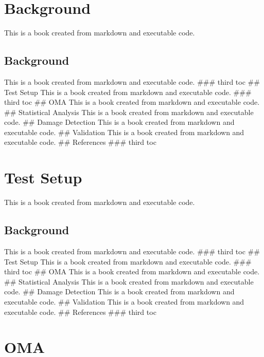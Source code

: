 \documentclass[
  letterpaper,
  DIV=11,
  numbers=noendperiod]{scrreprt}
\begin{document}
\hypertarget{background-15}{%
\chapter{Background}\label{background-15}}

This is a book created from markdown and executable code.

\hypertarget{background-16}{%
\section{Background}\label{background-16}}

This is a book created from markdown and executable code. \#\#\# third
toc \#\# Test Setup This is a book created from markdown and executable
code. \#\#\# third toc \#\# OMA This is a book created from markdown and
executable code. \#\# Statistical Analysis This is a book created from
markdown and executable code. \#\# Damage Detection This is a book
created from markdown and executable code. \#\# Validation This is a
book created from markdown and executable code. \#\# References \#\#\#
third toc

\hypertarget{test-setup-1}{%
\chapter{Test Setup}\label{test-setup-1}}

This is a book created from markdown and executable code.

\hypertarget{background-17}{%
\section{Background}\label{background-17}}

This is a book created from markdown and executable code. \#\#\# third
toc \#\# Test Setup This is a book created from markdown and executable
code. \#\#\# third toc \#\# OMA This is a book created from markdown and
executable code. \#\# Statistical Analysis This is a book created from
markdown and executable code. \#\# Damage Detection This is a book
created from markdown and executable code. \#\# Validation This is a
book created from markdown and executable code. \#\# References \#\#\#
third toc

\hypertarget{oma}{%
\chapter{OMA}\label{oma}}
\end{document}
